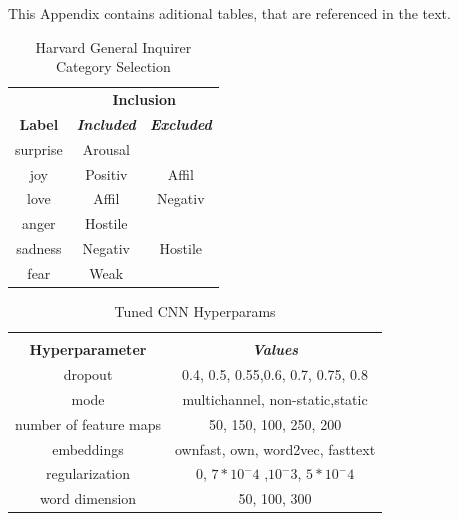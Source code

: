 \documentclass[conference]{IEEEtran}
\begin{document}
This Appendix contains aditional tables, that are referenced in the text.

\begin{table}[htbp]
\caption{Harvard General Inquirer Category Selection}
\begin{center}
\begin{tabular}{|c|c|c|}
\hline
\textbf{}&\multicolumn{2}{|c|}{\textbf{Inclusion}} \\ 
\cline{2-3}
\textbf{Label} & \textbf{\textit{Included}}& \textbf{\textit{Excluded}} \\
\hline
surprise & Arousal & \\
\hline
joy & Positiv & Affil \\
\hline
love & Affil & Negativ\\
\hline
anger & Hostile & \\
\hline
sadness & Negativ & Hostile\\
\hline
fear & Weak & \\
\hline
\end{tabular}
\label{taba3}
\end{center}
\end{table}

\begin{table}[htbp]
\caption{Tuned CNN Hyperparams}
\begin{center}
\begin{tabular}{|c|c|}
\hline
\textbf{}&\multicolumn{1}{|c|}{\textbf{}} \\ 
\cline{2-2}
\textbf{Hyperparameter} & \textbf{\textit{Values}} \\ 
\hline
dropout & 0.4, 0.5, 0.55,0.6, 0.7,  0.75, 0.8\\ 
\hline
mode & multichannel, non-static,static \\ 
\hline
number of feature maps & 50, 150, 100, 250, 200 \\ 
\hline
embeddings & ownfast, own, word2vec, fasttext \\ 
\hline
regularization & 0, $7*10^-4$ ,$10^-3$, $5*10^-4$ \\ 
\hline
word dimension & 50, 100, 300 \\ 
\hline
\end{tabular}
\label{tabahp}
\end{center}
\end{table}
\end{document}
